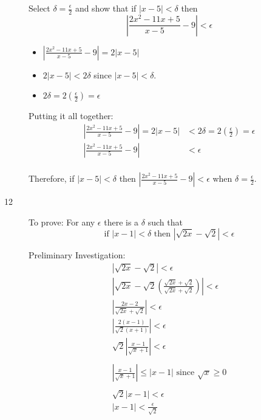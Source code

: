 \documentclass{exam}
\begin{document}
\begin{description}
Select $\delta = \frac{\epsilon}{2}$ and show that if $|x - 5| < \delta$ then 
\[
  \left|\frac{2x^2 - 11x + 5}{x-5} -9 \right| < \epsilon
\]

\vspace{0.2 cm}

\begin{itemize}
  \item $\left|\frac{2x^2 - 11x + 5}{x-5} -9 \right| = 2|x-5|$
  \item $2|x - 5| < 2 \delta$ since $|x - 5| < \delta$.
  \item $2 \delta = 2 \left( \frac{\epsilon}{2} \right) = \epsilon$
\end{itemize}

Putting it all together:
\begin{align*}
  \left|\frac{2x^2 - 11x + 5}{x-5} -9 \right| = 2|x-5| &< 2 \delta = 2 \left( \frac{\epsilon}{2} \right) = \epsilon \\ 
  \left|\frac{2x^2 - 11x + 5}{x-5} -9 \right| &< \epsilon \\ 
\end{align*}

Therefore, if $|x - 5| < \delta$ then $\left|\frac{2x^2 - 11x + 5}{x-5} -9 \right| < \epsilon$ when $\delta = \frac{\epsilon}{2}$.

\item[12]
To prove: For any $\epsilon$ there is a $\delta$ such that 
\[
  \text{if } |x - 1| < \delta \text{ then } | \sqrt{2x} - \sqrt{2} | < \epsilon
\]

Preliminary Investigation:
\begin{align*}
  | \sqrt{2x} - \sqrt{2}| < \epsilon \\
  \left| \sqrt{2x} - \sqrt{2} \left( \frac{\sqrt{2x} + \sqrt{2}}{\sqrt{2x} + \sqrt{2}} \right) \right| < \epsilon \\
  \left| \frac{2x - 2}{\sqrt{2x} + \sqrt{2}} \right| < \epsilon \\
  \left| \frac{2(x - 1)}{\sqrt{2}(x + 1)} \right| < \epsilon \\
  \sqrt{2} \left| \frac{x - 1}{\sqrt{x} + 1} \right| < \epsilon \\
  \\
  \left| \frac{x - 1}{\sqrt{x} + 1} \right| \leq |x - 1| \text{ since } \sqrt{x} \geq 0 \\
  \\
  \sqrt{2} | x - 1| < \epsilon \\
  | x - 1| < \frac{\epsilon}{\sqrt{2}} \\
\end{align*}


\end{description}
\end{document}
